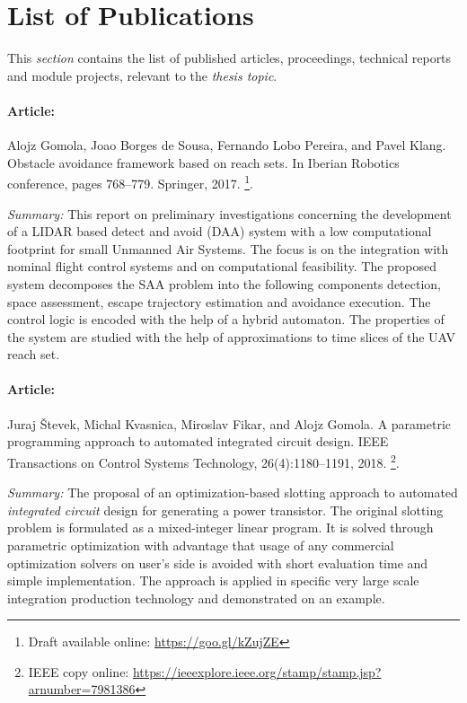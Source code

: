 \section{List of Publications}\label{sec:listOfPublications}

\noindent This \emph{section} contains the list of published articles, proceedings, technical reports and module projects, relevant to the \emph{thesis topic}.

\paragraph{Article:} Alojz Gomola, Joao Borges de Sousa, Fernando Lobo Pereira, and Pavel Klang. Obstacle avoidance framework based on reach sets. In Iberian Robotics conference, pages 768–779. Springer, 2017. \cite{gomola2017obstacle}\footnote{Draft available online: \url{https://goo.gl/kZujZE}}.

\emph{Summary:} This report on preliminary investigations concerning the development of a LIDAR based detect and avoid (DAA) system with a low computational footprint for small Unmanned Air Systems. The focus is on the integration with nominal flight control systems and on computational feasibility. The proposed system decomposes the SAA problem into the following components detection, space assessment, escape trajectory estimation and avoidance execution. The control logic is encoded with the help of a hybrid automaton. The properties of the system are studied with the help of approximations to time slices of the UAV reach set.


\paragraph{Article:}  Juraj {\v{S}}tevek,  Michal  Kvasnica,  Miroslav  Fikar,  and  Alojz  Gomola. A  parametric programming  approach  to  automated  integrated  circuit  design. IEEE Transactions on Control Systems Technology, 26(4):1180–1191, 2018. \cite{vstevek2018parametric}\footnote{IEEE copy online: \url{https://ieeexplore.ieee.org/stamp/stamp.jsp?arnumber=7981386}}.

\emph{Summary:} The proposal of an optimization-based slotting approach to automated \emph{integrated circuit} design for generating a power transistor. The original slotting problem is formulated as a mixed-integer linear program. It is solved through parametric optimization with advantage that usage of any commercial optimization solvers on user’s side is avoided with short evaluation time and simple implementation. The approach is applied in specific very large scale integration production technology and demonstrated on an example.

